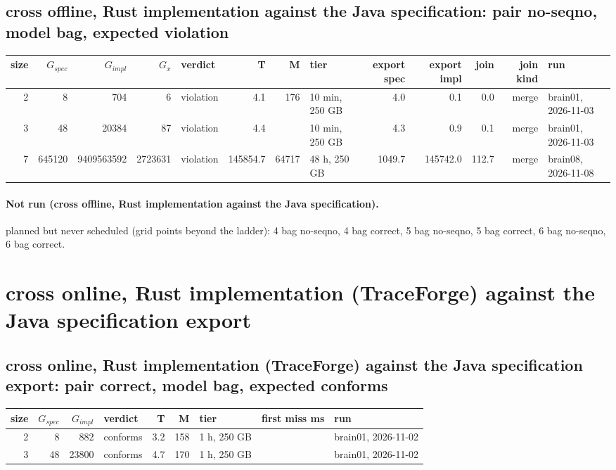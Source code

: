 \documentclass[10pt]{article}
\begin{document}
\subsection*{cross offline, Rust implementation against the Java specification: pair \textsf{no-seqno}, model bag, expected violation}
\begin{longtable}{@{}rrrrlrrlrrrrl@{}}
\toprule
size & $G_{\mathit{spec}}$ & $G_{\mathit{impl}}$ & $G_x$ & verdict & T & M & tier & export spec & export impl & join & join kind & run \\
\midrule
\endhead
\color{blue} 2 & 8 & 704 & 6 & violation & 4.1 & 176 & 10 min, 250 GB & 4.0 & 0.1 & 0.0 & merge & brain01, 2026-11-03 \\
\color{blue} 3 & 48 & 20384 & 87 & violation & 4.4 &  & 10 min, 250 GB & 4.3 & 0.9 & 0.1 & merge & brain01, 2026-11-03 \\
\color{red} 7 & 645120 & 9409563592 & 2723631 & violation & 145854.7 & 64717 & 48 h, 250 GB & 1049.7 & 145742.0 & 112.7 & merge & brain08, 2026-11-08 \\
\bottomrule
\end{longtable}
\paragraph{Not run (cross offline, Rust implementation against the Java specification).}
planned but never scheduled (grid points beyond the ladder): 4 bag no-seqno, 4 bag correct, 5 bag no-seqno, 5 bag correct, 6 bag no-seqno, 6 bag correct.\par
\section*{cross online, Rust implementation (TraceForge) against the Java specification export}
\subsection*{cross online, Rust implementation (TraceForge) against the Java specification export: pair \textsf{correct}, model bag, expected conforms}
\begin{longtable}{@{}rrrlrrlrl@{}}
\toprule
size & $G_{\mathit{spec}}$ & $G_{\mathit{impl}}$ & verdict & T & M & tier & first miss ms & run \\
\midrule
\endhead
\color{red} 2 & 8 & 882 & conforms & 3.2 & 158 & 1 h, 250 GB &  & brain01, 2026-11-02 \\
\color{red} 3 & 48 & 23800 & conforms & 4.7 & 170 & 1 h, 250 GB &  & brain01, 2026-11-02 \\
\bottomrule
\end{longtable}
\end{document}
